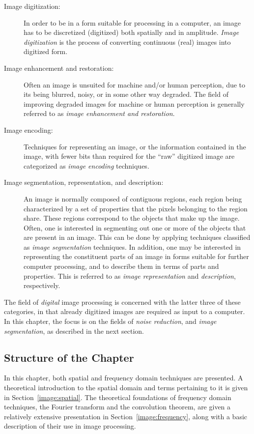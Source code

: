 \begin{description}
\item[Image digitization:] In order to be in a form suitable for
  processing in a computer, an image has to be discretized (digitized)
  both spatially and in amplitude.  {\em Image digitization\/} is the
  process of converting continuous (real) images into digitized form.
\item[Image enhancement and restoration:] Often an image is unsuited
  for machine and/or human perception, due to its being blurred,
  noisy, or in some other way degraded.  The field of improving
  degraded images for machine or human perception is generally
  referred to as {\em image enhancement and restoration\/}.
\item[Image encoding:] Techniques for representing an image, or the
  information contained in the image, with fewer bits than required
  for the ``raw'' digitized image are categorized as {\em image
    encoding\/} techniques.
\item[Image segmentation, representation, and description:] An image
  is normally composed of contiguous regions, each region being
  characterized by a set of properties that the pixels belonging to
  the region share.  These regions correspond to the objects that make
  up the image.  Often, one is interested in segmenting out one or
  more of the objects that are present in an image.  This can be done
  by applying techniques classified as {\em image segmentation\/}
  techniques.  In addition, one may be interested in representing the
  constituent parts of an image in forms suitable for further computer
  processing, and to describe them in terms of parts and properties.
  This is referred to as {\em image representation\/} and {\em
    description\/}, respectively.
\end{description}

The field of {\em digital\/} image processing is concerned with the
latter three of these categories, in that already digitized images are
required as input to a computer.  In this chapter, the focus is on the
fields of {\em noise reduction\/}, and {\em image segmentation\/}, as
described in the next section.

\subsection{Structure of the Chapter}
\label{image:intro:structure}

In this chapter, both spatial and frequency domain techniques are
presented.  A theoretical introduction to the spatial domain and terms
pertaining to it is given in Section~\ref{image:spatial}.  The
theoretical foundations of frequency domain techniques, the Fourier
transform and the convolution theorem, are given a relatively
extensive presentation in Section~\ref{image:frequency}, along with a
basic description of their use in image processing.

